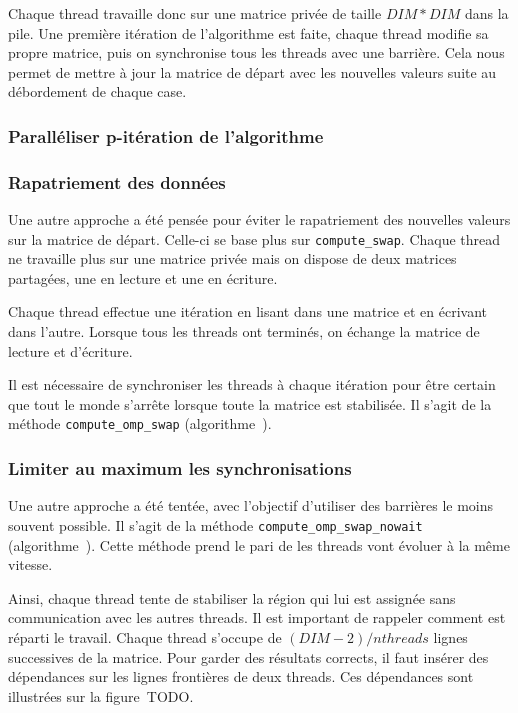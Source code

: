 Chaque thread travaille donc sur une matrice privée de taille
$DIM*DIM$ dans la pile. Une première itération de l'algorithme est
faite, chaque thread modifie sa propre matrice, puis on synchronise
tous les threads avec une barrière. Cela nous permet de mettre à jour
la matrice de départ avec les nouvelles valeurs suite au débordement
de chaque case.
\medskip

\subsubsection{Paralléliser p-itération de l'algorithme}


\subsubsection{Rapatriement des données}

Une autre approche a été pensée pour éviter le rapatriement des
nouvelles valeurs sur la matrice de départ. Celle-ci se base plus
sur \texttt{compute\eucl\_swap}. Chaque thread ne travaille plus sur
une matrice privée mais on dispose de deux matrices partagées, une en
lecture et une en écriture.

Chaque thread effectue une itération en lisant dans une matrice et en
écrivant dans l'autre. Lorsque tous les threads ont terminés, on
échange la matrice de lecture et d'écriture.

Il est nécessaire de synchroniser les threads à chaque itération pour
être certain que tout le monde s'arrête lorsque toute la matrice est
stabilisée. Il s'agit de la méthode \texttt{compute\_omp\_swap} (algorithme~).
\medskip

\subsubsection{Limiter au maximum les synchronisations}

Une autre approche a été tentée, avec l'objectif d'utiliser des
barrières le moins souvent possible. Il s'agit de la méthode
\texttt{compute\_omp\_swap\_nowait} (algorithme~). Cette méthode prend
le pari de les threads vont évoluer à la même vitesse.

Ainsi, chaque thread tente de stabiliser la région qui lui est
assignée sans communication avec les autres threads. Il est important
de rappeler comment est réparti le travail. Chaque thread s'occupe de
$(DIM-2)/nthreads$ lignes successives de la matrice. Pour garder des
résultats corrects, il faut insérer des dépendances sur les lignes
frontières de deux threads. Ces dépendances sont illustrées sur la
figure~TODO.

